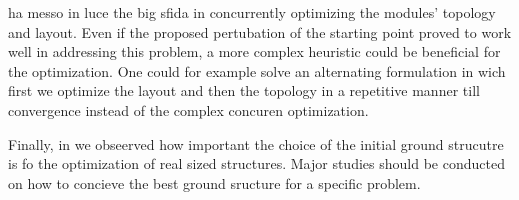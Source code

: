 \chpref{} ha messo in luce the big sfida in concurrently optimizing the modules' topology and layout. Even if the proposed pertubation of the starting point proved to work well in addressing this problem, a more complex heuristic could be beneficial for the optimization. One could for example solve an alternating formulation in wich first we optimize the layout and then the topology in a repetitive manner till convergence instead of the complex concuren optimization.


Finally, in \chpref{} we obseerved how important the choice of the initial ground strucutre is fo the optimization of real sized structures. Major studies should be conducted on how to concieve the best ground sructure for a specific problem.
